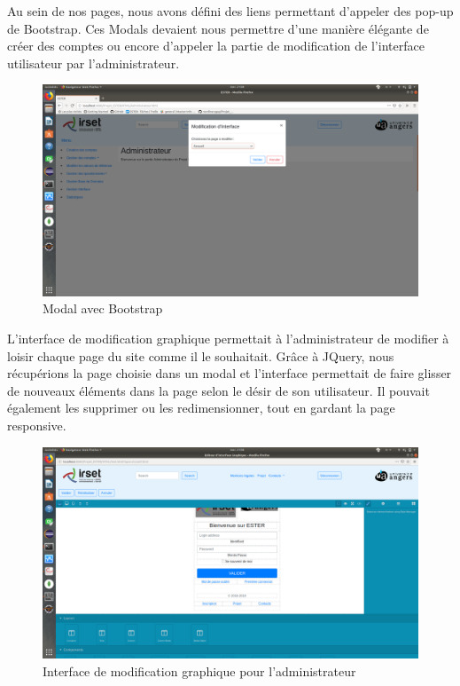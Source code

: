 Au sein de nos pages, nous avons défini des liens permettant d'appeler des pop-up de Bootstrap. Ces Modals devaient nous permettre d'une manière élégante de créer des comptes ou encore d'appeler la partie de modification de l'interface utilisateur par l'administrateur.

\begin{figure}[H]
    \begin{center}
	\includegraphics[scale=0.2,trim=2.8cm 0cm 0.8cm 5.3cm, clip=true]{img/modal}
    \end{center}
    \caption{Modal avec Bootstrap}
\end{figure}

L'interface de modification graphique permettait à l'administrateur de modifier à loisir chaque page du site comme il le souhaitait. Grâce à JQuery, nous récupérions la page choisie dans un modal et l'interface permettait de faire glisser de nouveaux éléments dans la page selon le désir de son utilisateur. Il pouvait également les supprimer ou les redimensionner, tout en gardant la page responsive.

\begin{figure}[H]
    \begin{center}
	\includegraphics[scale=0.2,trim=2.8cm 0cm 0.8cm 4.0cm, clip=true]{img/interface}
    \end{center}
    \caption{Interface de modification graphique pour l'administrateur}
\end{figure}


